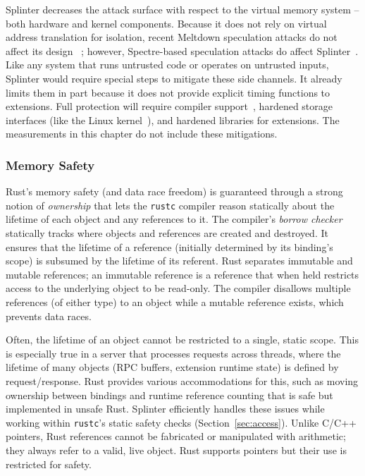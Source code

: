 Splinter decreases the attack surface with respect to the virtual memory system --
    both hardware and kernel components.
Because it does not rely on virtual address translation for
    isolation,
    recent Meltdown speculation attacks do not affect its design~\cite{meltdown-2018}%
; however, Spectre-based speculation attacks do affect Splinter~\cite{sbo,spectre-2018}.
Like any system that runs untrusted code or operates on untrusted
  inputs, Splinter would require special steps to mitigate these side channels.
It already limits them in part because it does not provide explicit
  timing functions to extensions.
Full protection will require compiler support~\cite{llvm-spectre},
hardened storage interfaces (like
  the Linux kernel~\cite{linux-spectre}), and hardened libraries for
  extensions.
The measurements in this chapter do not include these mitigations.

\subsubsection{Memory Safety}
\label{sec:safety}

Rust's memory safety (and data race freedom) is guaranteed through a strong notion
  of \textsl{ownership} that lets the \texttt{rustc} compiler reason statically
  about the lifetime of each object and any references to it.
The compiler's \textsl{borrow checker} statically tracks where objects and
  references are created and destroyed.
It ensures that the lifetime of a reference (initially determined by its binding's scope)
  is subsumed by the lifetime of its referent.
Rust separates immutable and mutable references; an immutable reference is a
  reference that when held restricts access to the underlying object to be read-only.
The compiler disallows multiple references (of either type) to
  an object while a mutable reference exists, which prevents data races.

Often, the lifetime of an object cannot be restricted to a single, static scope.
This is especially true in a server that processes requests across threads,
  where the lifetime of many objects (RPC buffers, extension runtime
  state) is defined by request/response.
Rust provides various accommodations for this, such as moving ownership between
  bindings and runtime reference counting that is safe but implemented in unsafe Rust.
Splinter efficiently handles these issues while working within
\texttt{rustc}'s static safety checks (Section~\ref{sec:access}).
Unlike C/C++ pointers, Rust references cannot be fabricated or manipulated with
  arithmetic; they always refer to a valid, live object.
Rust supports pointers but their use is restricted for safety.

